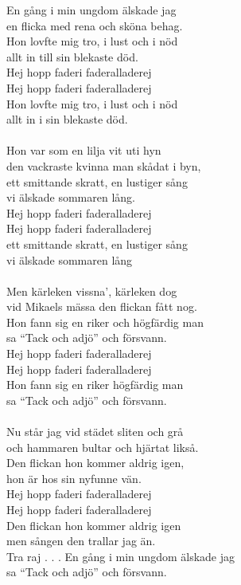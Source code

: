 \vspace{10pt}
En gång i min ungdom älskade jag\\
en flicka med rena och sköna behag.\\
Hon lovfte mig tro, i lust och i nöd\\
allt in till sin blekaste död.\\
Hej hopp faderi faderalladerej\\
Hej hopp faderi faderalladerej\\
Hon lovfte mig tro, i lust och i nöd\\
allt in i sin blekaste död.\\
\\
Hon var som en lilja vit uti hyn\\
den vackraste kvinna man skådat i byn,\\
ett smittande skratt, en lustiger sång\\
vi älskade sommaren lång.\\
Hej hopp faderi faderalladerej\\
Hej hopp faderi faderalladerej\\
ett smittande skratt, en lustiger sång\\
vi älskade sommaren lång\\
\\
Men kärleken vissna', kärleken dog\\
vid Mikaels mässa den flickan fått nog.\\
Hon fann sig en riker och högfärdig man\\
sa ``Tack och adjö'' och försvann.\\
Hej hopp faderi faderalladerej\\
Hej hopp faderi faderalladerej\\
Hon fann sig en riker högfärdig man\\
sa ``Tack och adjö'' och försvann.\\
\\
Nu står jag vid städet sliten och grå\\
och hammaren bultar och hjärtat likså.\\
Den flickan hon kommer aldrig igen,\\
hon är hos sin nyfunne vän.\\
Hej hopp faderi faderalladerej\\
Hej hopp faderi faderalladerej\\
Den flickan hon kommer aldrig igen\\
men sången den trallar jag än.\\
Tra raj . . .
\vspace{15pt}
\vspace{10pt}
En gång i min ungdom älskade jag\\
sa ``Tack och adjö'' och försvann.
